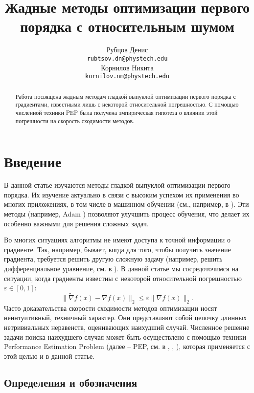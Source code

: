 \documentclass{article}
\title{Жадные методы оптимизации первого порядка с относительным шумом}
\author{
	Рубцов Денис \\
	\texttt{rubtsov.dn@phystech.edu} \\
	\And
	Корнилов Никита \\
	\texttt{kornilov.nm@phystech.edu} \\
}
\date{}
\begin{document}
\maketitle

\begin{abstract}
Работа посвящена жадным методам гладкой выпуклой оптимизации первого порядка с градиентами, известными лишь с некоторой относительной погрешностью. С помощью численной техники PEP была получена эмпирическая гипотеза о влиянии этой погрешности на скорость сходимости методов. 

\end{abstract}



\section{\textbf{Введение}}

В данной статье изучаются методы гладкой выпуклой оптимизации первого порядка. Их изучение актуально в связи с высоким успехом их применения во многих приложениях, в том числе в машинном обучении (см., например, в \cite{bottou2007tradeoffs}). Эти методы (например, Adam \cite{kingma2014adam}) позволяют улучшить процесс обучения, что делает их особенно важными для решения сложных задач. 

Во многих ситуациях алгоритмы не имеют доступа к точной информации о градиенте. Так, например, бывает, когда для того, чтобы получить значение градиента, требуется решить другую сложную задачу (например, решить дифференциальное уравнение, см. в \cite{matyukhin2021convex}). В данной статье мы сосредоточимся на ситуации, когда градиенты известны с некоторой относительной погрешностью $\varepsilon \in [0, 1]$: $$\|\widetilde{\nabla} f(x) - \nabla f(x)\|_2 \leq \varepsilon \|\nabla f(x)\|_2.$$
Часто доказательства скорости сходимости методов оптимизации носят неинтуитивный, техничный характер. Они представляют собой цепочку длинных нетривиальных неравенств, оценивающих наихудший случай. Численное решение задачи поиска наихудшего случая может быть осуществлено с помощью техники Performance Estimation Problem (далее -- PEP, см. в \cite{goujaud2022pepit}, \cite{taylor2017smooth}, \cite{taylor2017convex}), которая применяется с этой целью и в данной статье.

\subsection{Определения и обозначения}
\end{document}
